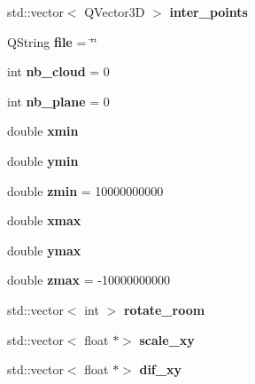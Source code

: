 \begin{DoxyCompactItemize}
std\+::vector$<$ Q\+Vector3D $>$ {\bfseries inter\+\_\+points}
\item 
\mbox{\label{classMainWindow_a04a17ff8d2a8277e3d4802fe73707d00}} 
Q\+String {\bfseries file} = \char`\"{}\char`\"{}
\item 
\mbox{\label{classMainWindow_a48b24b52a6700ee721be76e4dbaa2786}} 
int {\bfseries nb\+\_\+cloud} = 0
\item 
\mbox{\label{classMainWindow_a135297d2d090cc0ae454a11ade9a2a00}} 
int {\bfseries nb\+\_\+plane} = 0
\item 
\mbox{\label{classMainWindow_ac9e38e6da6b793162eb083600af2b9e4}} 
double {\bfseries xmin}
\item 
\mbox{\label{classMainWindow_aae093db91dd3f5a8363d02f9634483ad}} 
double {\bfseries ymin}
\item 
\mbox{\label{classMainWindow_ad8bed6b99e90163c778d24e3380b59d2}} 
double {\bfseries zmin} = 10000000000
\item 
\mbox{\label{classMainWindow_a6a24b68c9a57c46121804c1fecf58bff}} 
double {\bfseries xmax}
\item 
\mbox{\label{classMainWindow_afcc020e854fddff3c814ce17a532fe97}} 
double {\bfseries ymax}
\item 
\mbox{\label{classMainWindow_a6ab24bd943f474b3ec49c3ce8377ea3a}} 
double {\bfseries zmax} = -\/10000000000
\item 
\mbox{\label{classMainWindow_a1e872447c53d990b385fc134264eb645}} 
std\+::vector$<$ int $>$ {\bfseries rotate\+\_\+room}
\item 
\mbox{\label{classMainWindow_afed123a278aeb01ec3507297365c01d0}} 
std\+::vector$<$ float $\ast$$>$ {\bfseries scale\+\_\+xy}
\item 
\mbox{\label{classMainWindow_ac3997f5d657dae5e5a53d6a7ff58f210}} 
std\+::vector$<$ float $\ast$$>$ {\bfseries dif\+\_\+xy}

\end{DoxyCompactItemize}
